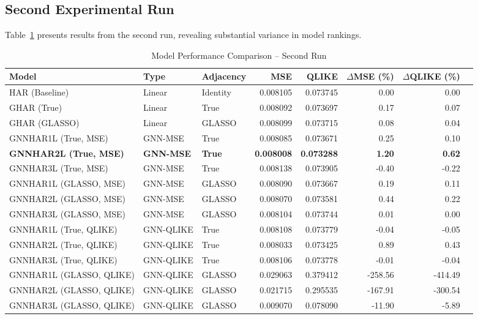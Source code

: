 \documentclass[10pt,a4paper]{article}
\begin{document}
\subsection{Second Experimental Run}

Table~\ref{tab:run2} presents results from the second run, revealing substantial variance in model rankings.

\begin{table}[H]
\centering
\caption{Model Performance Comparison -- Second Run}
\label{tab:run2}
\small
\begin{tabular}{@{}lllrrrrr@{}}
\toprule
Model & Type & Adjacency & MSE & QLIKE & $\Delta$MSE (\%) & $\Delta$QLIKE (\%) \\
\midrule
HAR (Baseline) & Linear & Identity & 0.008105 & 0.073745 & 0.00 & 0.00 \\
GHAR (True) & Linear & True & 0.008092 & 0.073697 & 0.17 & 0.07 \\
GHAR (GLASSO) & Linear & GLASSO & 0.008099 & 0.073715 & 0.08 & 0.04 \\
\midrule
GNNHAR1L (True, MSE) & GNN-MSE & True & 0.008085 & 0.073671 & 0.25 & 0.10 \\
\textbf{GNNHAR2L (True, MSE)} & \textbf{GNN-MSE} & \textbf{True} & \textbf{0.008008} & \textbf{0.073288} & \textbf{1.20} & \textbf{0.62} \\
GNNHAR3L (True, MSE) & GNN-MSE & True & 0.008138 & 0.073905 & -0.40 & -0.22 \\
\midrule
GNNHAR1L (GLASSO, MSE) & GNN-MSE & GLASSO & 0.008090 & 0.073667 & 0.19 & 0.11 \\
GNNHAR2L (GLASSO, MSE) & GNN-MSE & GLASSO & 0.008070 & 0.073581 & 0.44 & 0.22 \\
GNNHAR3L (GLASSO, MSE) & GNN-MSE & GLASSO & 0.008104 & 0.073744 & 0.01 & 0.00 \\
\midrule
GNNHAR1L (True, QLIKE) & GNN-QLIKE & True & 0.008108 & 0.073779 & -0.04 & -0.05 \\
GNNHAR2L (True, QLIKE) & GNN-QLIKE & True & 0.008033 & 0.073425 & 0.89 & 0.43 \\
GNNHAR3L (True, QLIKE) & GNN-QLIKE & True & 0.008106 & 0.073778 & -0.01 & -0.04 \\
\midrule
GNNHAR1L (GLASSO, QLIKE) & GNN-QLIKE & GLASSO & 0.029063 & 0.379412 & -258.56 & -414.49 \\
GNNHAR2L (GLASSO, QLIKE) & GNN-QLIKE & GLASSO & 0.021715 & 0.295535 & -167.91 & -300.54 \\
GNNHAR3L (GLASSO, QLIKE) & GNN-QLIKE & GLASSO & 0.009070 & 0.078090 & -11.90 & -5.89 \\
\bottomrule
\end{tabular}
\end{table}
\end{document}
